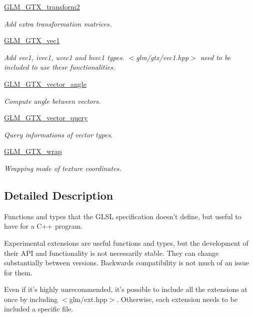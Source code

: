 \begin{CompactItemize}
\item 
\hyperlink{group__gtx__transform2}{GLM\_\-GTX\_\-transform2}
\begin{CompactList}\small\item\em Add extra transformation matrices. \item\end{CompactList}

\item 
\hyperlink{group__gtx__vec1}{GLM\_\-GTX\_\-vec1}
\begin{CompactList}\small\item\em Add vec1, ivec1, uvec1 and bvec1 types. $<$glm/gtx/vec1.hpp$>$ need to be included to use these functionalities. \item\end{CompactList}

\item 
\hyperlink{group__gtx__vector__angle}{GLM\_\-GTX\_\-vector\_\-angle}
\begin{CompactList}\small\item\em Compute angle between vectors. \item\end{CompactList}

\item 
\hyperlink{group__gtx__vector__query}{GLM\_\-GTX\_\-vector\_\-query}
\begin{CompactList}\small\item\em Query informations of vector types. \item\end{CompactList}

\item 
\hyperlink{group__gtx__wrap}{GLM\_\-GTX\_\-wrap}
\begin{CompactList}\small\item\em Wrapping mode of texture coordinates. \item\end{CompactList}

\end{CompactItemize}


\subsection{Detailed Description}
Functions and types that the GLSL specification doesn't define, but useful to have for a C++ program. 

Experimental extensions are useful functions and types, but the development of their API and functionality is not necessarily stable. They can change substantially between versions. Backwards compatibility is not much of an issue for them.

Even if it's highly unrecommended, it's possible to include all the extensions at once by including $<$glm/ext.hpp$>$. Otherwise, each extension needs to be included a specific file. 